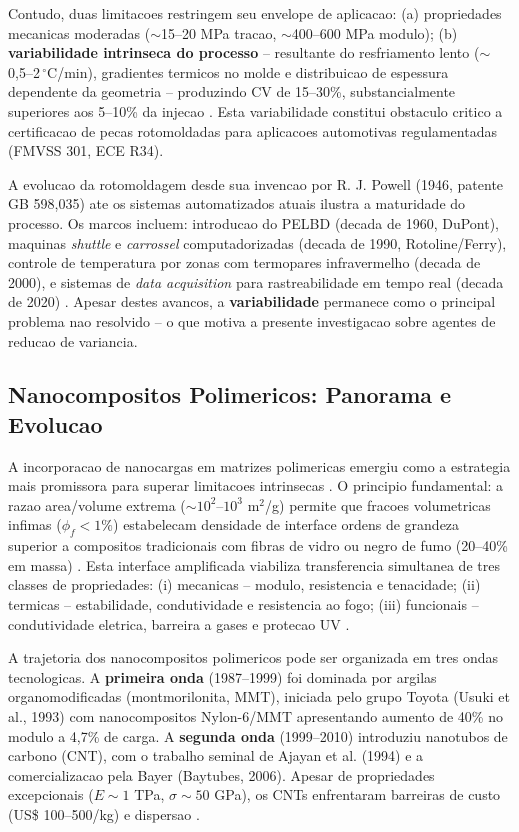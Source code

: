 \documentclass[11pt,a4paper,oneside]{article}
\begin{document}
Contudo, duas limitacoes restringem seu envelope de aplicacao: (a) propriedades mecanicas moderadas (${\sim}$15--20 MPa tracao, ${\sim}$400--600 MPa modulo); (b) {\bfseries variabilidade intrinseca do processo} -- resultante do resfriamento lento (${\sim}$0,5--2\,$^{\circ}$C/min), gradientes termicos no molde e distribuicao de espessura dependente da geometria -- produzindo CV de 15--30\%, substancialmente superiores aos 5--10\% da injecao \cite{Ren2021, Montgomery2020}. Esta variabilidade constitui obstaculo critico a certificacao de pecas rotomoldadas para aplicacoes automotivas regulamentadas (FMVSS 301, ECE R34).

A evolucao da rotomoldagem desde sua invencao por R. J. Powell (1946, patente GB 598,035) ate os sistemas automatizados atuais ilustra a maturidade do processo. Os marcos incluem: introducao do PELBD (decada de 1960, DuPont), maquinas \textit{shuttle} e \textit{carrossel} computadorizadas (decada de 1990, Rotoline/Ferry), controle de temperatura por zonas com termopares infravermelho (decada de 2000), e sistemas de \textit{data acquisition} para rastreabilidade em tempo real (decada de 2020) \cite{Islabao2005}. Apesar destes avancos, a {\bfseries variabilidade} permanece como o principal problema nao resolvido -- o que motiva a presente investigacao sobre agentes de reducao de variancia.

\subsection{Nanocompositos Polimericos: Panorama e Evolucao}

A incorporacao de nanocargas em matrizes polimericas emergiu como a estrategia mais promissora para superar limitacoes intrinsecas \cite{Kim2010}. O principio fundamental: a razao area/volume extrema (${\sim}10^2$--$10^3$ m$^2$/g) permite que fracoes volumetricas infimas ($\phi_f{<}1\%$) estabelecam densidade de interface ordens de grandeza superior a compositos tradicionais com fibras de vidro ou negro de fumo (20--40\% em massa) \cite{Geim2007, Stankovich2006}. Esta interface amplificada viabiliza transferencia simultanea de tres classes de propriedades: (i) mecanicas -- modulo, resistencia e tenacidade; (ii) termicas -- estabilidade, condutividade e resistencia ao fogo; (iii) funcionais -- condutividade eletrica, barreira a gases e protecao UV \cite{Potts2011, Mohan2018}.

A trajetoria dos nanocompositos polimericos pode ser organizada em tres ondas tecnologicas. A {\bfseries primeira onda} (1987--1999) foi dominada por argilas organomodificadas (montmorilonita, MMT), iniciada pelo grupo Toyota (Usuki et al., 1993) com nanocompositos Nylon-6/MMT apresentando aumento de 40\% no modulo a 4,7\% de carga. A {\bfseries segunda onda} (1999--2010) introduziu nanotubos de carbono (CNT), com o trabalho seminal de Ajayan et al. (1994) e a comercializacao pela Bayer (Baytubes, 2006). Apesar de propriedades excepcionais ($E{\sim}1$ TPa, $\sigma{\sim}50$ GPa), os CNTs enfrentaram barreiras de custo (US\$ 100--500/kg) e dispersao \cite{Young2012}.
\end{document}
